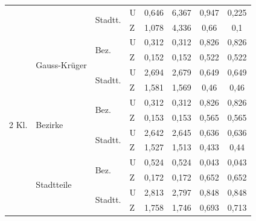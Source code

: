 \documentclass{Vorlage}
\begin{document}
\begin{table}[h]
\begin{tabular}{llll|cc|cc}
                        &                               & \multirow{2}{*}{Stadtt.} & U & 0,646       & 6,367       &   0,947           &   0,225  \\
                        &                               &                          & Z & 1,078        & 4,336       &   0,66           &                0,1 \\ \hline
\multirow{12}{*}{2 Kl.}  & \multirow{4}{*}{Gauss-Krüger} & \multirow{2}{*}{Bez.}   & U & 0,312      & 0,312      &     0,826           &  0,826
 \\
                        &                               &                          & Z & 0,152      & 0,152      &   0,522           &  0,522     \\ \cline{3-8} 
                        &                               & \multirow{2}{*}{Stadtt.} & U & 2,694       & 2,679     &   0,649          &  0,649   \\
                        &                               &                          & Z & 1,581       & 1,569      &  0,46            &   0,46   \\ \cline{2-8} 
                        & \multirow{4}{*}{Bezirke}      & \multirow{2}{*}{Bez.}    & U & 0,312       & 0,312      &  0,826            &   0,826    \\
                        &                               &                          & Z & 0,153       & 0,153      &  0,565            &  0,565    \\ \cline{3-8} 
                        &                               & \multirow{2}{*}{Stadtt.} & U & 2,642       & 2,645      &  0,636           &   0,636    \\
                        &                               &                          & Z & 1,527       & 1,513    &  0,433            &    0,44   
\\ \cline{2-8} 
                        & \multirow{4}{*}{Stadtteile}   & \multirow{2}{*}{Bez.}    & U & 0,524       & 0,524      &   0,043          &    0,043 \\
                        &                               &                          & Z & 0,172       & 0,172      &     0,652        &     0,652 \\ \cline{3-8} 
                        &                               & \multirow{2}{*}{Stadtt.} & U & 2,813        &  2,797      &  0,848     &  0,848 \\
                        &                               &                          & Z & 1,758        & 1,746     &    0,693     &     0,713
                         \\ \hline \hline
\end{tabular}
\end{table}
\end{document}
